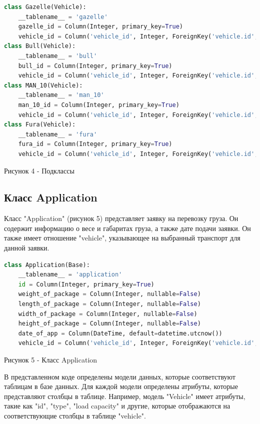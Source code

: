 \documentclass[14pt]{extreport}
\begin{document}
    \begin{lstlisting}[language=Python]
class Gazelle(Vehicle):
    __tablename__ = 'gazelle'
    gazelle_id = Column(Integer, primary_key=True)
    vehicle_id = Column('vehicle_id', Integer, ForeignKey('vehicle.id', ondelete='CASCADE'))
class Bull(Vehicle):
    __tablename__ = 'bull'
    bull_id = Column(Integer, primary_key=True)
    vehicle_id = Column('vehicle_id', Integer, ForeignKey('vehicle.id', ondelete='CASCADE'))
class MAN_10(Vehicle):
    __tablename__ = 'man_10'
    man_10_id = Column(Integer, primary_key=True)
    vehicle_id = Column('vehicle_id', Integer, ForeignKey('vehicle.id', ondelete='CASCADE'))
class Fura(Vehicle):
    __tablename__ = 'fura'
    fura_id = Column(Integer, primary_key=True)
    vehicle_id = Column('vehicle_id', Integer, ForeignKey('vehicle.id', ondelete='CASCADE'))
                \end{lstlisting}
            \begin{center}
                Рисунок 4 - Подклассы 
            \end{center}
            \subsection{Класс Application}
            Класс "Application" (рисунок 5) представляет заявку на перевозку груза. Он содержит информацию о весе и габаритах груза, а также дате подачи заявки. Он также имеет отношение "vehicle", указывающее на выбранный транспорт для данной заявки.


    \begin{lstlisting}[language=Python]
class Application(Base):
    __tablename__ = 'application'
    id = Column(Integer, primary_key=True)
    weight_of_package = Column(Integer, nullable=False)
    length_of_package = Column(Integer, nullable=False)
    width_of_package = Column(Integer, nullable=False)
    height_of_package = Column(Integer, nullable=False)
    date_of_app = Column(DateTime, default=datetime.utcnow())
    vehicle_id = Column('vehicle_id', Integer, ForeignKey('vehicle.id', ondelete='CASCADE'))
                        \end{lstlisting}
                    \begin{center}
                        Рисунок 5 - Класс Application
                    \end{center}

    В представленном коде определены модели данных, которые соответствуют таблицам в базе данных. Для каждой модели определены атрибуты, которые представляют столбцы в таблице. Например, модель "Vehicle" имеет атрибуты, такие как "id", "type", "load capacity" и другие, которые отображаются на соответствующие столбцы в таблице "vehicle".
\end{document}
